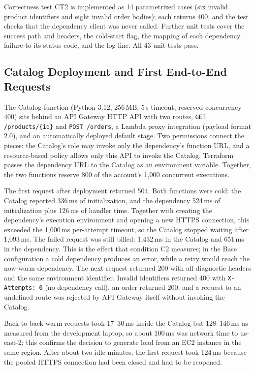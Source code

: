 \documentclass[10pt]{article}
\begin{document}
Correctness test CT2 is implemented as 14 parametrized cases (six invalid
product identifiers and eight invalid order bodies); each returns 400, and the
test checks that the dependency client was never called. Further unit tests
cover the success path and headers, the cold-start flag, the mapping of each
dependency failure to its status code, and the log line. All 43 unit tests pass.

\subsection{Catalog Deployment and First End-to-End Requests}
The Catalog function (Python 3.12, 256\,MB, 5\,s timeout, reserved concurrency
400) sits behind an API Gateway HTTP API with two routes,
\texttt{GET /products/\{id\}} and \texttt{POST /orders}, a Lambda proxy
integration (payload format 2.0), and an automatically deployed default stage.
Two permissions connect the pieces: the Catalog's role may invoke only the
dependency's function URL, and a resource-based policy allows only this API to
invoke the Catalog. Terraform passes the dependency URL to the Catalog as an
environment variable. Together, the two functions reserve 800 of the account's
1{,}000 concurrent executions.

The first request after deployment returned 504. Both functions were cold: the
Catalog reported 336\,ms of initialization, and the dependency 524\,ms of
initialization plus 126\,ms of handler time. Together with creating the
dependency's execution environment and opening a new HTTPS connection, this
exceeded the 1{,}000\,ms per-attempt timeout, so the Catalog stopped waiting
after 1{,}093\,ms. The failed request was still billed: 1{,}432\,ms in the
Catalog and 651\,ms in the dependency. This is the effect that condition C2
measures; in the Base configuration a cold dependency produces an error, while
a retry would reach the now-warm dependency. The next request returned 200 with
all diagnostic headers and the same environment identifier. Invalid identifiers
returned 400 with \texttt{X-Attempts: 0} (no dependency call), an order
returned 200, and a request to an undefined route was rejected by API Gateway
itself without invoking the Catalog.

Back-to-back warm requests took 17--30\,ms inside the Catalog but 128--146\,ms
as measured from the development laptop, so about 100\,ms was network time to
us-east-2; this confirms the decision to generate load from an EC2 instance in
the same region. After about two idle minutes, the first request took 124\,ms
because the pooled HTTPS connection had been closed and had to be reopened.
\end{document}
